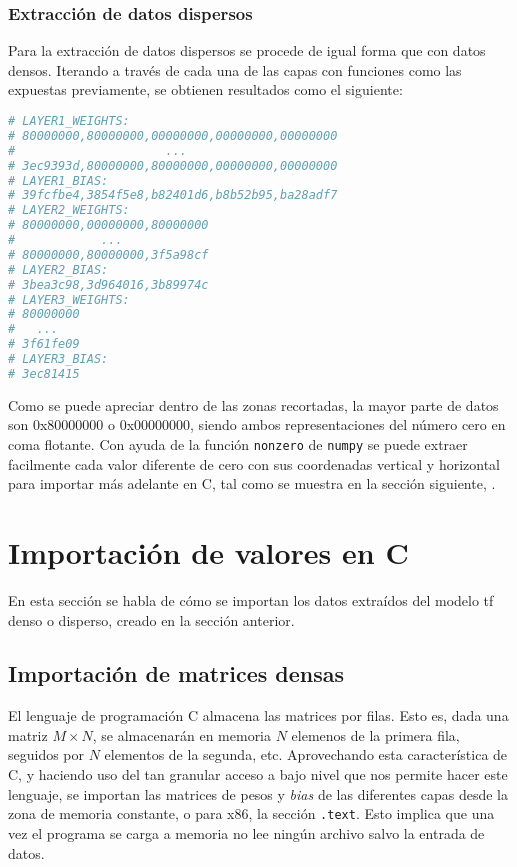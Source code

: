 \subsubsection{Extracción de datos dispersos}
\label{sssec:extraccion_datos_dispersos}
Para la extracción de datos dispersos se procede de igual forma que con datos densos. Iterando a través de cada una de las capas con funciones como las expuestas previamente, se obtienen resultados como el siguiente:\medskip
\begin{lstlisting}[language=Python]
# LAYER1_WEIGHTS:
# 80000000,80000000,00000000,00000000,00000000
#                     ...
# 3ec9393d,80000000,80000000,00000000,00000000
# LAYER1_BIAS:
# 39fcfbe4,3854f5e8,b82401d6,b8b52b95,ba28adf7
# LAYER2_WEIGHTS:
# 80000000,00000000,80000000
#            ...
# 80000000,80000000,3f5a98cf
# LAYER2_BIAS:
# 3bea3c98,3d964016,3b89974c
# LAYER3_WEIGHTS:
# 80000000
#   ...
# 3f61fe09
# LAYER3_BIAS:
# 3ec81415    
\end{lstlisting}

Como se puede apreciar dentro de las zonas recortadas, la mayor parte de datos son 0x80000000 o 0x00000000, siendo ambos representaciones del número cero en coma flotante. Con ayuda de la función \texttt{nonzero} de \texttt{numpy} se puede extraer facilmente cada valor diferente de cero con sus coordenadas vertical y horizontal para importar más adelante en C, tal como se muestra en la sección siguiente, .

\section{Importación de valores en C}
\label{sec:importacion_valores_c}
En esta sección se habla de cómo se importan los datos extraídos del modelo \acrshort{tf} denso o disperso, creado en la sección anterior.

\subsection{Importación de matrices densas}
\label{ssec:importacion_matrices_densas}
El lenguaje de programación C almacena las matrices por filas. Esto es, dada una matriz $M \times N$, se almacenarán en memoria $N$ elemenos de la primera fila, seguidos por $N$ elementos de la segunda, etc. Aprovechando esta característica de C, y haciendo uso del tan granular acceso a bajo nivel que nos permite hacer este lenguaje, se importan las matrices de pesos y \textit{bias} de las diferentes capas desde la zona de memoria constante, o para x86, la sección \texttt{.text}. Esto implica que una vez el programa se carga a memoria no lee ningún archivo salvo la entrada de datos.

